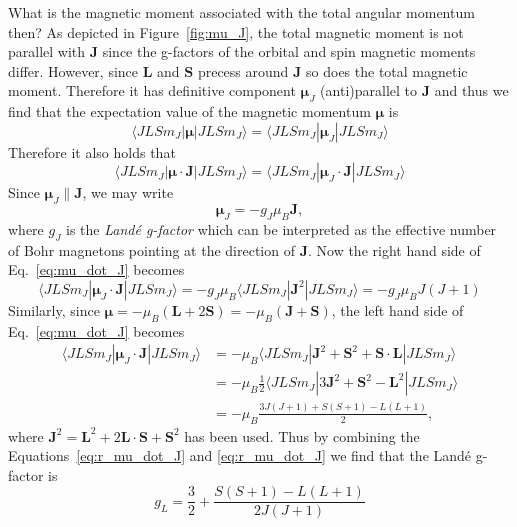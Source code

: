 What is the magnetic moment associated with the total angular momentum then?
As depicted in Figure~\ref{fig:mu_J}, the total magnetic moment is not parallel with $\mathbf{J}$ since the g-factors of the orbital and spin magnetic moments differ. However, since $\mathbf{L}$ and $\mathbf{S}$ precess around $\mathbf{J}$ so does the total magnetic moment. Therefore it has definitive component $\boldsymbol{\mu}_J$ (anti)parallel to $\mathbf{J}$ and thus we find that the expectation value of the magnetic momentum $\boldsymbol{\mu}$ is 
\begin{equation}
\langle JLSm_J|\boldsymbol{\mu}|JLSm_J\rangle
= \langle JLSm_J|\boldsymbol{\mu}_J|JLSm_J\rangle
\end{equation}
Therefore it also holds that 
\begin{equation}\label{eq:mu_dot_J}
\langle JLSm_J|\boldsymbol{\mu}\cdot\mathbf{J}|JLSm_J\rangle
= \langle JLSm_J|\boldsymbol{\mu}_J\cdot\mathbf{J}|JLSm_J\rangle
\end{equation}
Since $\boldsymbol{\mu}_J \| \mathbf{J}$, we may write
\begin{equation}
\boldsymbol{\mu}_J = - g_J \mu_B \mathbf{J},
\end{equation}
where $g_J$ is the \emph{Land\'{e} g-factor} which can be interpreted as the effective number of Bohr magnetons pointing at the direction of $\mathbf{J}$. Now the right hand side of Eq.~\eqref{eq:mu_dot_J} becomes
\begin{equation}
\langle JLSm_J|\boldsymbol{\mu}_J\cdot\mathbf{J}|JLSm_J\rangle = - g_J \mu_B \langle JLSm_J|\mathbf{J}^2 |JLSm_J\rangle = - g_J \mu_B J(J+1) \label{eq:r_mu_dot_J}
\end{equation}
Similarly, since $\boldsymbol{\mu} = - \mu_B (\mathbf{L} + 2 \mathbf{S}) = - \mu_B (\mathbf{J} + \mathbf{S})$, the left hand side of Eq.~\eqref{eq:mu_dot_J} becomes
\begin{align}
\langle JLSm_J|\boldsymbol{\mu}_J\cdot\mathbf{J}|JLSm_J\rangle &= - \mu_B \langle JLSm_J|\mathbf{J}^2+\mathbf{S}^2+\mathbf{S}\cdot\mathbf{L}|JLSm_J\rangle
\nonumber \\
&= - \mu_B \frac{1}{2} \langle JLSm_J|3 \mathbf{J}^2+ \mathbf{S}^2-  \mathbf{L}^2|JLSm_J\rangle 
\nonumber \\
&= - \mu_B \frac{3J(J+1)+S(S+1)-L(L+1)}{2}, \label{eq:l_mu_dot_J}
\end{align}
where $\mathbf{J}^2 = \mathbf{L}^2 + 2\mathbf{L} \cdot \mathbf{S} + \mathbf{S}^2$ has been used. Thus by combining the Equations~\eqref{eq:r_mu_dot_J} and \eqref{eq:r_mu_dot_J} we find that the Land\'{e} g-factor is
\begin{equation}
g_L = \frac{3}{2} + \frac{S(S+1)-L(L+1)}{2J(J+1)}
\end{equation}




 
\nocite{ashcroftmermin,blundell_book}


